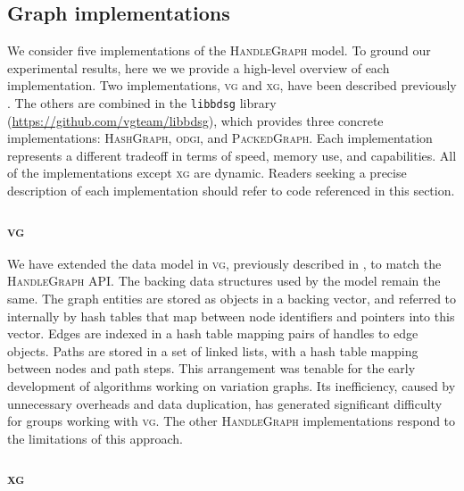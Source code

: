 \documentclass{article}
\begin{document}


\subsection{Graph implementations}

We consider five implementations of the \textsc{HandleGraph} model.
To ground our experimental results, here we we provide a high-level overview of each implementation.
Two implementations, \textsc{vg} and \textsc{xg}, have been described previously \cite{Garrison_2018,Garrison_2019}.
The others are combined in the \texttt{libbdsg} library (\url{https://github.com/vgteam/libbdsg}), which provides three concrete implementations: \textsc{HashGraph}, \textsc{odgi}, and \textsc{PackedGraph}.
Each implementation represents a different tradeoff in terms of speed, memory use, and capabilities.
All of the implementations except \textsc{xg} are dynamic.
Readers seeking a precise description of each implementation should refer to code referenced in this section.

\subsubsection{\textsc{vg}}

We have extended the data model in \textsc{vg}, previously described in \cite{Garrison_2018}, to match the \textsc{HandleGraph} API.
The backing data structures used by the model remain the same.
The graph entities are stored as objects in a backing vector, and referred to internally by hash tables that map between node identifiers and pointers into this vector.
Edges are indexed in a hash table mapping pairs of handles to edge objects.
Paths are stored in a set of linked lists, with a hash table mapping between nodes and path steps.
This arrangement was tenable for the early development of algorithms working on variation graphs.
Its inefficiency, caused by unnecessary overheads and data duplication, has generated significant difficulty for groups working with \textsc{vg}.
The other \textsc{HandleGraph} implementations respond to the limitations of this approach.

\subsubsection{\textsc{xg}}
\end{document}
